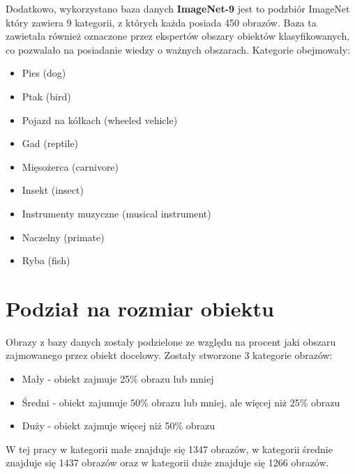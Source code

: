 Dodatkowo, wykorzystano baza danych \textbf{ImageNet-9} jest to podzbiór ImageNet który zawiera 9 kategorii, z których każda posiada 450 obrazów.
Baza ta zawietała również oznaczone przez ekspertów obszary obiektów klasyfikowanych, co pozwalało na posiadanie wiedzy o ważnych obszarach.
Kategorie obejmowały:
\begin{itemize}
	\item Pies (dog)
	\item Ptak (bird)
	\item Pojazd na kółkach (wheeled vehicle)
	\item Gad (reptile)
	\item Mięsożerca (carnivore)
	\item Insekt (insect)
	\item Instrumenty muzyczne (musical instrument)
	\item Naczelny (primate)
	\item Ryba (fish)
\end{itemize}

\section*{Podział na rozmiar obiektu}

Obrazy z bazy danych zostały podzielone ze względu na procent jaki obszaru zajmowanego przez obiekt docelowy.
Zostały stworzone 3 kategorie obrazów:
\begin{itemize}
	\item Mały - obiekt zajmuje 25\% obrazu lub mniej
	\item Średni - obiekt zajumuje 50\% obrazu lub mniej, ale więcej niż 25\% obrazu
	\item Duży - obiekt zajmuje więcej niż 50\% obrazu
\end{itemize}

W tej pracy w kategorii małe znajduje się 1347 obrazów, w kategorii średnie znajduje się 1437 obrazów oraz w kategorii duże znajduje się 1266 obrazów.


